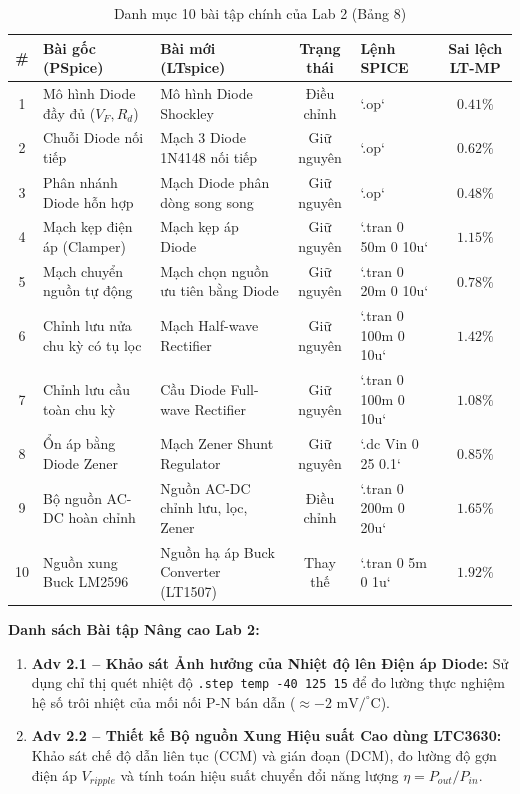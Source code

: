 \documentclass[12pt,a4paper]{report}
\begin{document}
\begin{table}[H]
\centering
\caption{Danh mục 10 bài tập chính của Lab 2 (Bảng 8)}
\label{tab:lab2_details}
\renewcommand{\arraystretch}{1.2}
\small
\begin{tabularx}{\textwidth}{|c|p{4.2cm}|p{4.0cm}|c|l|c|}
\hline
\rowcolor{codebg}
\textbf{\#} & \textbf{Bài gốc (PSpice)} & \textbf{Bài mới (LTspice)} & \textbf{Trạng thái} & \textbf{Lệnh SPICE} & \textbf{Sai lệch LT-MP} \\ \hline
1 & Mô hình Diode đầy đủ ($V_F, R_d$) & Mô hình Diode Shockley & Điều chỉnh & `.op` & $0.41\%$ \\ \hline
2 & Chuỗi Diode nối tiếp & Mạch 3 Diode 1N4148 nối tiếp & Giữ nguyên & `.op` & $0.62\%$ \\ \hline
3 & Phân nhánh Diode hỗn hợp & Mạch Diode phân dòng song song & Giữ nguyên & `.op` & $0.48\%$ \\ \hline
4 & Mạch kẹp điện áp (Clamper) & Mạch kẹp áp Diode & Giữ nguyên & `.tran 0 50m 0 10u` & $1.15\%$ \\ \hline
5 & Mạch chuyển nguồn tự động & Mạch chọn nguồn ưu tiên bằng Diode & Giữ nguyên & `.tran 0 20m 0 10u` & $0.78\%$ \\ \hline
6 & Chỉnh lưu nửa chu kỳ có tụ lọc & Mạch Half-wave Rectifier & Giữ nguyên & `.tran 0 100m 0 10u` & $1.42\%$ \\ \hline
7 & Chỉnh lưu cầu toàn chu kỳ & Cầu Diode Full-wave Rectifier & Giữ nguyên & `.tran 0 100m 0 10u` & $1.08\%$ \\ \hline
8 & Ổn áp bằng Diode Zener & Mạch Zener Shunt Regulator & Giữ nguyên & `.dc Vin 0 25 0.1` & $0.85\%$ \\ \hline
9 & Bộ nguồn AC-DC hoàn chỉnh & Nguồn AC-DC chỉnh lưu, lọc, Zener & Điều chỉnh & `.tran 0 200m 0 20u` & $1.65\%$ \\ \hline
10 & Nguồn xung Buck LM2596 & Nguồn hạ áp Buck Converter (LT1507) & Thay thế & `.tran 0 5m 0 1u` & $1.92\%$ \\ \hline
\end{tabularx}
\end{table}

\textbf{Danh sách Bài tập Nâng cao Lab 2:}
\begin{enumerate}
    \item \textbf{Adv 2.1 -- Khảo sát Ảnh hưởng của Nhiệt độ lên Điện áp Diode:} Sử dụng chỉ thị quét nhiệt độ \lstinline|.step temp -40 125 15| để đo lường thực nghiệm hệ số trôi nhiệt của mối nối P-N bán dẫn ($\approx -2\text{ mV}/^\circ\text{C}$).
    \item \textbf{Adv 2.2 -- Thiết kế Bộ nguồn Xung Hiệu suất Cao dùng LTC3630:} Khảo sát chế độ dẫn liên tục (CCM) và gián đoạn (DCM), đo lường độ gợn điện áp $V_{ripple}$ và tính toán hiệu suất chuyển đổi năng lượng $\eta = P_{out}/P_{in}$.
\end{enumerate}
\end{document}

